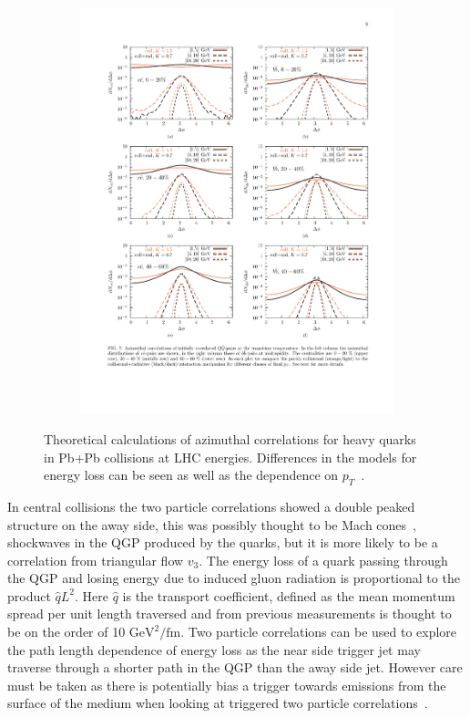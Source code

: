 \begin{figure}[htbp]
\begin{center}
\begin{subfigure}{0.75\textwidth}
        \includegraphics[width=\textwidth]{Plots/Intro/bb_cent.pdf}
        \caption{}
        \label{fig:bbbarcent}
    \end{subfigure}
	\end{center}
\caption[Correlations $c$ and $b$ at LHC Energies]{Theoretical calculations of azimuthal correlations for heavy quarks in Pb+Pb collisions at LHC energies. Differences in the models for energy loss can be seen as well as the dependence on $p_{T}$~\cite{qqazi}.}
\label{fig:qqcorr}
\end{figure}

In central collisions the two particle correlations showed a double peaked structure on the away side, this was possibly thought to be Mach cones~\cite{mcone}, shockwaves in the QGP produced by the quarks, but it is more likely to be a correlation from triangular flow $v_3$. The energy loss of a quark passing through the QGP and losing energy due to induced gluon radiation is proportional to the product $\hat{q}L^2$. Here $\hat{q}$ is the transport coefficient, defined as the mean momentum spread per unit length traversed and from previous measurements is thought to be on the order of 10 $\text{GeV}^2/\text{fm}$. Two particle correlations can be used to explore the path length dependence of energy loss as the near side trigger jet may traverse through a shorter path in the QGP than the away side jet. However care must be taken as there is potentially bias a trigger towards emissions from the surface of the medium when looking at triggered two particle correlations~\cite{biasshower}. 

